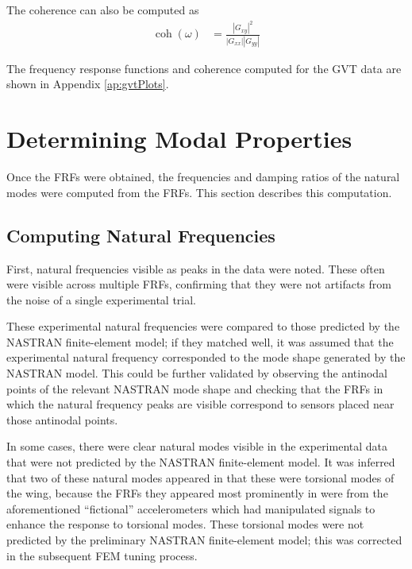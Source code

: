 The coherence can also be computed as
\begin{align}
    \operatorname{coh}(\omega) &= \frac{|G_{xy}|^2}{|G_{xx}||G_{yy}|}
\end{align}

The frequency response functions and coherence computed for the GVT data are shown in Appendix \ref{ap:gvtPlots}.

\section{Determining Modal Properties} %

Once the FRFs were obtained, the frequencies and damping ratios of the natural modes were computed from the FRFs. This section describes this computation.

\subsection{Computing Natural Frequencies}

First, natural frequencies visible as peaks in the data were noted. These often were visible across multiple FRFs, confirming that they were not artifacts from the noise of a single experimental trial.

These experimental natural frequencies were compared to those predicted by the NASTRAN finite-element model; if they matched well, it was assumed that the experimental natural frequency corresponded to the mode shape generated by the NASTRAN model. This could be further validated by observing the antinodal points of the relevant NASTRAN mode shape and checking that the FRFs in which the natural frequency peaks are visible correspond to sensors placed near those antinodal points.

In some cases, there were clear natural modes visible in the experimental data that were not predicted by the NASTRAN finite-element model. It was inferred that two of these natural modes appeared in that these were torsional modes of the wing, because the FRFs they appeared most prominently in were from the aforementioned ``fictional'' accelerometers which had manipulated signals to enhance the response to torsional modes. These torsional modes were not predicted by the preliminary NASTRAN finite-element model; this was corrected in the subsequent FEM tuning process.

